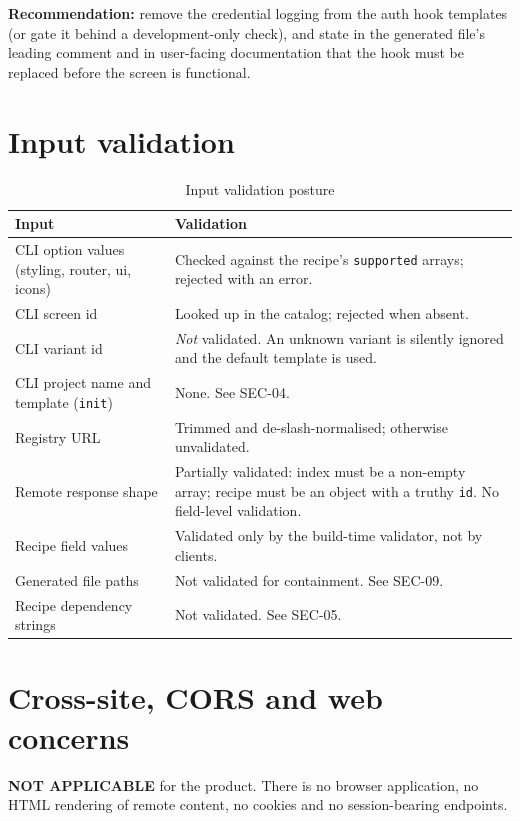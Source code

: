 \textbf{Recommendation:} remove the credential logging from the auth hook templates
(or gate it behind a development-only check), and state in the generated file's
leading comment and in user-facing documentation that the hook must be replaced
before the screen is functional.

\section{Input validation}

\begin{longtable}{p{4.4cm}p{9.8cm}}
\caption{Input validation posture}\\
\toprule
\textbf{Input} & \textbf{Validation} \\
\midrule

CLI option values (styling, router, ui, icons) & Checked against the recipe's
\texttt{supported} arrays; rejected with an error. \\
CLI screen id & Looked up in the catalog; rejected when absent. \\
CLI variant id & \emph{Not} validated. An unknown variant is silently ignored and the
default template is used. \\
CLI project name and template (\texttt{init}) & None. See SEC-04. \\
Registry URL & Trimmed and de-slash-normalised; otherwise unvalidated. \\
Remote response shape & Partially validated: index must be a non-empty array;
recipe must be an object with a truthy \texttt{id}. No field-level validation. \\
Recipe field values & Validated only by the build-time validator, not by clients. \\
Generated file paths & Not validated for containment. See SEC-09. \\
Recipe dependency strings & Not validated. See SEC-05. \\
\bottomrule
\end{longtable}

\section{Cross-site, CORS and web concerns}

\textbf{NOT APPLICABLE} for the product. There is no browser application, no HTML
rendering of remote content, no cookies and no session-bearing endpoints.

